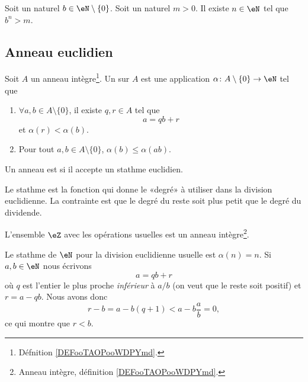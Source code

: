 \begin{proposition}	\label{PROPooPLLSooUpiLKa}
	Soit un naturel \( b\in\eN\setminus\{ 0 \}\). Soit un naturel \( m>0\). Il existe \( n\in \eN\) tel que \( b^n>m\).
\end{proposition}



\subsection{Anneau euclidien}


\begin{definition} \label{DefAXitWRL}
	Soit \( A\) un anneau intègre\footnote{Défnition \ref{DEFooTAOPooWDPYmd}.}. Un  sur \( A\) est une application \( \alpha\colon A\setminus\{ 0 \}\to \eN\) tel que
	\begin{enumerate}
		\item       \label{ITEMooLVJAooLpjgEz}
		      \( \forall a,b\in A\setminus\{ 0 \}\), il existe \( q,r\in A\) tel que
		      \begin{equation}
			      a=qb+r
		      \end{equation}
		      et \( \alpha(r)<\alpha(b)\).
		\item
		      Pour tout \( a,b\in A\setminus\{ 0 \}\), \( \alpha(b)\leq \alpha(ab)\).
	\end{enumerate}
	Un anneau est  si il accepte un stathme euclidien.
\end{definition}
Le stathme est la fonction qui donne le «degré» à utiliser dans la division euclidienne. La contrainte est que le degré du reste soit plus petit que le degré du dividende.

\begin{lemma}       \label{LEMooFUSTooDCcBDb}
	L'ensemble \( \eZ\) avec les opérations usuelles est un anneau intègre\footnote{Anneau intègre, définition \ref{DEFooTAOPooWDPYmd}.}.
\end{lemma}

\begin{example} \label{ExwqlCwvV}
	Le stathme de \( \eN\) pour la division euclidienne usuelle est \( \alpha(n)=n\). Si \( a,b\in \eN\) nous écrivons
	\begin{equation}
		a=qb+r
	\end{equation}
	où \( q\) est l'entier le plus proche \emph{inférieur} à \( a/b\) (on veut que le reste soit positif) et \( r=a-qb\). Nous avons donc
	\begin{equation}
		r-b=a-b(q+1)<a-b\frac{ a }{ b }=0,
	\end{equation}
	ce qui montre que \( r<b\).
\end{example}

